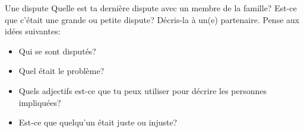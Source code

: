 \begin{frame}{Une dispute}
  Quelle est ta dernière dispute avec un membre de la famille?
  Est-ce que c'était une grande ou petite dispute?
  Décris-la à un(e) partenaire.
  Pense aux idées suivantes:
  \begin{itemize}
    \item Qui se sont disputés?
    \item Quel était le problème?
    \item Quels adjectifs est-ce que tu peux utiliser pour décrire les personnes impliquées?
    \item Est-ce que quelqu'un était juste ou injuste?
  \end{itemize}
\end{frame}
